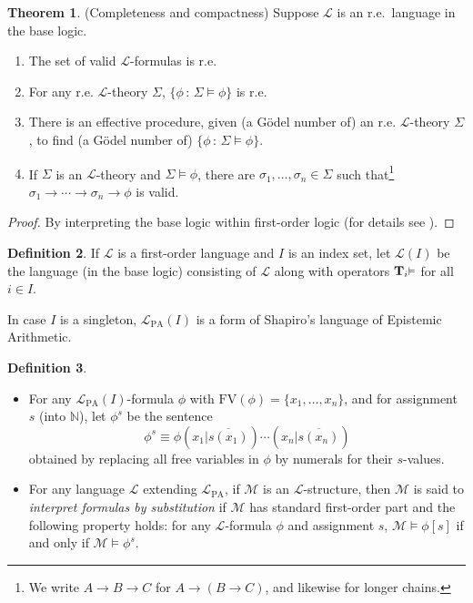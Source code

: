 \documentclass[reqno]{article}
\theoremstyle{definition}
\newtheorem{theorem}{Theorem}
\newtheorem{definition}[theorem]{Definition}
\def\N{\mathbb{N}}
\def\L{\mathscr{L}}
\def\T{\mathbf{T}}
\def\FV{\mathrm{FV}}
\def\LPA{\L_{\mathrm{PA}}}
\renewcommand{\Pr}[1]{\T_{#1}\mbox{\small${\vDash}$}}
\begin{document}
\begin{theorem}
\label{completecompact}
(Completeness and compactness)  Suppose $\L$ is an r.e.~language in the base logic.
\begin{enumerate}
\item The set of valid $\L$-formulas is r.e.
\item For any r.e. $\L$-theory $\Sigma$, $\{\phi\,:\,\Sigma\models\phi\}$ is r.e.
\item There is an effective procedure, given (a G\"odel number of) an r.e.
$\L$-theory $\Sigma$,
to find (a G\"odel number of) $\{\phi\,:\,\Sigma\models\phi\}$.
\item If $\Sigma$ is an $\L$-theory and $\Sigma\models\phi$, there
are $\sigma_1,\ldots,\sigma_n\in\Sigma$ such that\footnote{We write
$A\rightarrow B\rightarrow C$ for $A\rightarrow (B\rightarrow C)$, and likewise for longer
chains.} $\sigma_1\rightarrow\cdots\rightarrow\sigma_n\rightarrow\phi$ is valid.
\end{enumerate}
\end{theorem}

\begin{proof}
By interpreting the base logic within first-order logic (for details see \cite{alexanderdissert}).
\end{proof}

\begin{definition}
\label{selfrefdefn}
If $\L$ is a first-order language and $I$ is an index set, let $\L(I)$ be the
language (in the base logic) consisting of $\L$ along with 
operators $\Pr{i}$ for all $i\in I$.
\end{definition}


In case $I$ is a singleton, $\LPA(I)$ is a form of Shapiro's \cite{shapiro1985}
language of Epistemic Arithmetic.


\begin{definition}
\label{sentencemaker}
\begin{itemize}
\item
For any $\LPA(I)$-formula $\phi$ with $\FV(\phi)=\{x_1,\ldots,x_n\}$, and for
assignment $s$ (into $\N$), let $\phi^s$ be the sentence
\[
\phi^s \equiv \phi(x_1|\overline{s(x_1)})\cdots(x_n|\overline{s(x_n)})
\]
obtained by replacing all free variables in $\phi$ by numerals for their
$s$-values.
\item
For any language $\mathscr L$ extending $\LPA$, if $\mathscr M$ is an
$\mathscr L$-structure, then $\mathscr M$
is said to \emph{interpret formulas by substitution} if $\mathscr M$ has
standard first-order part and the following
property holds: for any $\mathscr L$-formula $\phi$ and assignment $s$,
$\mathscr M\models\phi[s]$ if and only if $\mathscr M\models\phi^s$.
\end{itemize}
\end{definition}
\end{document}
